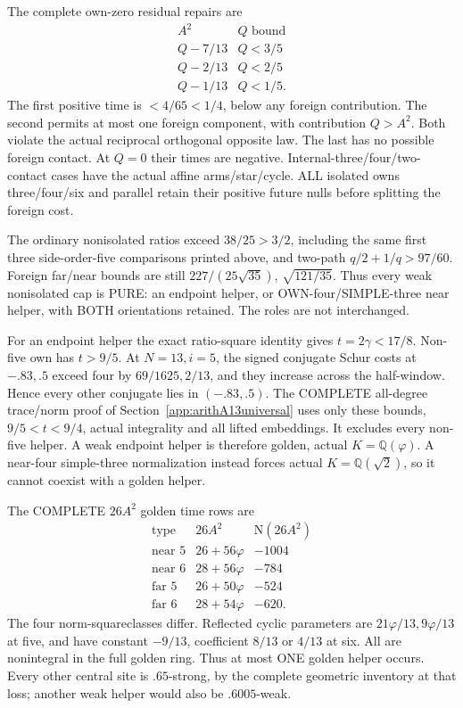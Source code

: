 The complete own-zero residual repairs are
\[
 \begin{array}{c|c}
 A^2&Q\text{ bound}\\ \hline
 Q-7/13&Q<3/5\\
 Q-2/13&Q<2/5\\
 Q-1/13&Q<1/5 .
 \end{array}
\]
The first positive time is \(<4/65<1/4\),
below any foreign contribution.
The second permits at most one foreign component,
with contribution \(Q>A^2\).
Both violate the actual reciprocal orthogonal
opposite law.
The last has no possible foreign contact.
At \(Q=0\) their times are negative.
Internal-three/four/two-contact cases have the
actual affine arms/star/cycle.
ALL isolated owns three/four/six and parallel
retain their positive future nulls before
splitting the foreign cost.

The ordinary nonisolated ratios exceed
\(38/25>3/2\), including the same first three
side-order-five comparisons printed above,
and two-path \(q/2+1/q>97/60\).
Foreign far/near bounds are still
\(227/(25\sqrt{35})\), \(\sqrt{121/35}\).
Thus every weak nonisolated cap is PURE:
an endpoint helper, or OWN-four/SIMPLE-three
near helper, with BOTH orientations retained.
The roles are not interchanged.

For an endpoint helper the exact ratio-square
identity gives \(t=2\gamma<17/8\).
Non-five own has \(t>9/5\).
At \(N=13,i=5\), the signed conjugate Schur
costs at \(-.83,.5\) exceed four by
\(69/1625,2/13\), and they increase across
the half-window.
Hence every other conjugate lies in
\((-.83,.5)\).
The COMPLETE all-degree trace/norm proof
of Section~\ref{app:arithA13universal} uses
only these bounds, \(9/5<t<9/4\), actual
integrality and all lifted embeddings.
It excludes every non-five helper.
A weak endpoint helper is therefore golden,
actual \(K=\mathbb Q(\varphi)\).
A near-four simple-three normalization instead
forces actual \(K=\mathbb Q(\sqrt2)\), so
it cannot coexist with a golden helper.

The COMPLETE \(26A^2\) golden time rows are
\[
\begin{array}{c|c|r}
 \text{type}&26A^2&\mathrm N(26A^2)\\ \hline
 \text{near }5&26+56\varphi&-1004\\
 \text{near }6&28+56\varphi&-784\\
 \text{far }5&26+50\varphi&-524\\
 \text{far }6&28+54\varphi&-620 .
\end{array}
\]
The four norm-squareclasses differ.
Reflected cyclic parameters are
\(21\varphi/13,9\varphi/13\) at five,
and have constant \(-9/13\), coefficient
\(8/13\) or \(4/13\) at six.
All are nonintegral in the full golden ring.
Thus at most ONE golden helper occurs.
Every other central site is \(.65\)-strong,
by the complete geometric inventory at that
loss; another weak helper would also be
\(.6005\)-weak.

